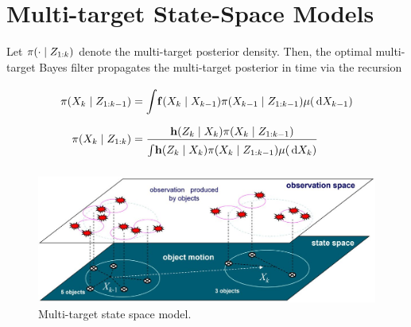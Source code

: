 \documentclass[a4paper,10pt]{scrreprt}
\theoremstyle{theorem}
\theoremstyle{definition}
\begin{document}
\section{Multi-target State-Space Models}

Let $ \pi(\cdot \mid Z_{1:k}) $ denote the multi-target posterior density.
Then, the optimal multi-target Bayes filter propagates the multi-target posterior in time via the recursion

\begin{align}
	\pi(\stSet_\tind \mid \msSet_{1:\tind-1}) 
	&= \integ \stFcn(\stSet_\tind \mid \stSet_{\tind-1}) \pi(\stSet_{\tind-1} \mid \msSet_{1:\tind-1}) \mu(\dx[\stSet_{\tind-1}]) \\
	\pi(\stSet_\tind \mid \msSet_{1:\tind}) 
	&= \frac{\msFcn(\msSet_\tind \mid \stSet_\tind) \pi(\stSet_\tind \mid \msSet_{1:\tind-1})}{\integ \msFcn(\msSet_\tind \mid \stSet_\tind) \pi(\stSet_\tind \mid \msSet_{1:\tind-1}) \mu(\dx[\stSet_\tind])}
\end{align}


\begin{figure}[h]
	\centering
	\includegraphics[scale=0.25]{./img/multi-target_state_space_model}
	\caption{Multi-target state space model.}
\end{figure}
\end{document}
